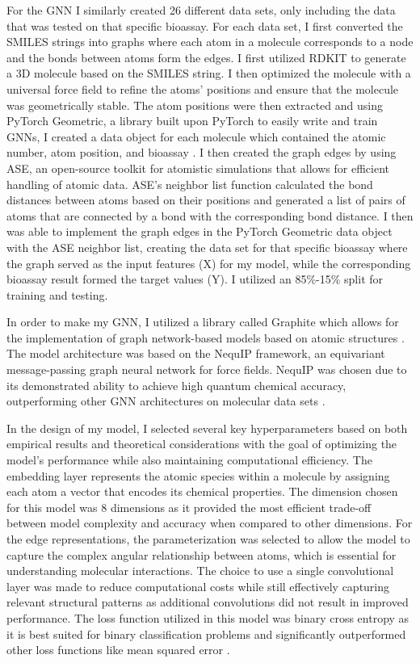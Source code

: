 \documentclass[10pt,twocolumn]{article}
\begin{document}
For the GNN I similarly created 26 different data sets, only including the data that was tested on that specific bioassay. For each data set, I first converted the SMILES strings into graphs where each atom in a molecule corresponds to a node and the bonds between atoms form the edges. I first utilized RDKIT to generate a 3D molecule based on the SMILES string. I then optimized the molecule with a universal force field to refine the atoms' positions and ensure that the molecule was geometrically stable. The atom positions were then extracted and using PyTorch Geometric, a library built upon PyTorch to easily write and train GNNs, I created a data object for each molecule which contained the atomic number, atom position, and bioassay \textcite{pyg}. I then created the graph edges by using ASE, an open-source toolkit for atomistic simulations that allows for efficient handling of atomic data. ASE’s neighbor list function calculated the bond distances between atoms based on their positions and generated a list of pairs of atoms that are connected by a bond with the corresponding bond distance. I then was able to implement the graph edges in the PyTorch Geometric data object with the ASE neighbor list, creating the data set for that specific bioassay where the graph served as the input features (X) for my model, while the corresponding bioassay result formed the target values (Y). I utilized an 85\%-15\% split for training and testing. 

In order to make my GNN, I utilized a library called Graphite which allows for the implementation of graph network-based models based on atomic structures \textcite{graphite}. The model architecture was based on the NequIP framework, an equivariant message-passing graph neural network for force fields. NequIP was chosen due to its demonstrated ability to achieve high quantum chemical accuracy, outperforming other GNN architectures on molecular data sets \textcite{nequip}. 

In the design of my model, I selected several key hyperparameters based on both empirical results and theoretical considerations with the goal of optimizing the model's performance while also maintaining computational efficiency. The embedding layer represents the atomic species within a molecule by assigning each atom a vector that encodes its chemical properties. The dimension chosen for this model was 8 dimensions as it provided the most efficient trade-off between model complexity and accuracy when compared to other dimensions. For the edge representations, the parameterization was selected to allow the model to capture the complex angular relationship between atoms, which is essential for understanding molecular interactions. The choice to use a single convolutional layer was made to reduce computational costs while still effectively capturing relevant structural patterns as additional convolutions did not result in improved performance. The loss function utilized in this model was binary cross entropy as it is best suited for binary classification problems and significantly outperformed other loss functions like mean squared error \textcite{loss}. 
\end{document}
